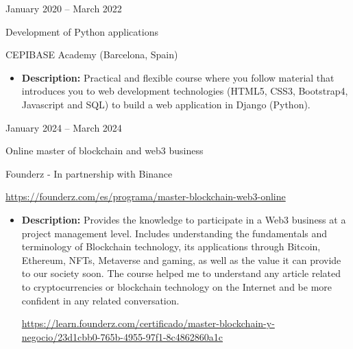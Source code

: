 \documentclass[a4paper,10pt]{article}
\newlength{\cvcolumngapwidth}
\newlength{\cvleftcolumnwidth}
\newlength{\cvrightcolumnwidth}
\newcommand{\cvtitlestyle}[1]{{\large\cvtitlefont\textcolor{cvtitlecolor}{#1}}}
\newcommand{\cvdurationstyle}[1]{{\small\cvdurationfont\textcolor{cvdurationcolor}{#1}}}
\newlength{\cvafteritemskipamount}
\newlength{\cvaftertitleskipamount}
\newlength{\cvparskip}
\newcommand{\cvitem}[2]{
    \begin{minipage}[t]{\cvleftcolumnwidth}
        \raggedleft #1
    \end{minipage}%
    \hspace{\cvcolumngapwidth}%
    \begin{minipage}[t]{\cvrightcolumnwidth}
        \setlength{\parskip}{\cvparskip} #2
    \end{minipage}

    \vspace{\cvafteritemskipamount}
}
\newcommand{\cvtitle}[1]{
    \cvtitlestyle{#1}

    \vspace{\cvaftertitleskipamount}
    \vspace{-\cvparskip}
}
\begin{document}

\cvitem{
 \cvdurationstyle{January 2020 -- March 2022 \hspace{10pt}}
}{
    \cvtitle{Development of Python applications} 

    CEPIBASE Academy (Barcelona, Spain)
    \vspace{5pt}
    \begin{itemize}[leftmargin=*]
        \item \textbf{Description:} Practical and flexible course where you follow material that introduces you to web development technologies (HTML5, CSS3, Bootstrap4, Javascript and SQL) to build a web application in Django (Python).
          
    \end{itemize}
}


\cvitem{
 \cvdurationstyle{January 2024 -- March 2024 \hspace{10pt}}
}{
    \cvtitle{Online master of blockchain and web3 business} 

    Founderz - In partnership with Binance
    \vspace{5pt}
    \begin{center}
        \url{https://founderz.com/es/programa/master-blockchain-web3-online}
    \end{center}
    \begin{itemize}[leftmargin=*]
        \item \textbf{Description:} Provides the knowledge to participate in a Web3 business at a project management level. Includes understanding the fundamentals and terminology of Blockchain technology, its applications through Bitcoin, Ethereum, NFTs, Metaverse and gaming, as well as the value it can provide to our society soon. The course helped me to understand any article related to cryptocurrencies or blockchain technology on the Internet and be more confident in any related conversation.

        \begin{center}
            \url{https://learn.founderz.com/certificado/master-blockchain-y-negocio/23d1cbb0-765b-4955-97f1-8c4862860a1c}
        \end{center}
          
    \end{itemize}
}

\end{document}
